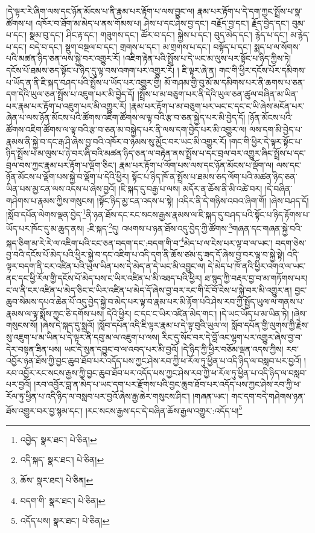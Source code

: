 །དེ་ལྟར་རེ་ཞིག་ལས་དང་ཉོན་མོངས་པ་ནི་རྣམ་པར་རྟོག་པ་ལས་བྱུང་ལ། རྣམ་པར་རྟོག་པ་དེ་དག་ཀྱང་སྤྲོས་པ་སྣ་ཚོགས་པ། འཁོར་བ་ཐོག་མ་མེད་པ་ནས་གོམས་པ། ཤེས་པ་དང་ཤེས་བྱ་དང་། བརྗོད་བྱ་དང་། རྗོད་བྱེད་དང་། བུམ་པ་དང་། སྣམ་བུ་དང་། ཤིང་རྟ་དང་། གཟུགས་དང་། ཚོར་བ་དང་། སྐྱེས་པ་དང་། བུད་མེད་དང་། རྙེད་པ་དང་། མ་རྙེད་པ་དང་། བདེ་བ་དང་། སྡུག་བསྔལ་བ་དང་། གྲགས་པ་དང་། མ་གྲགས་པ་དང་། བསྟོད་པ་དང་། སྨད་པ་ལ་སོགས་པའི་མཚན་ཉིད་ཅན་ལས་སྐྱེ་བར་འགྱུར་རོ། །འཇིག་རྟེན་པའི་སྤྲོས་པ་དེ་ཡང་མ་ལུས་པར་སྟོང་པ་ཉིད་ཀྱིས་ཏེ། དངོས་པོ་ཐམས་ཅད་སྟོང་པ་ཉིད་དུ་ལྟ་བས་འགག་པར་འགྱུར་རོ། །
ཇི་ལྟར་ཞེ་ན། གང་གི་ཕྱིར་དངོས་པོར་དམིགས་པ་ཡོད་ན་ནི་ཇི་སྐད་བཤད་པའི་སྤྲོས་པ་ཡོད་པར་འགྱུར་གྱི། མོ་གཤམ་གྱི་བུ་མོ་མ་དམིགས་པར་ནི་ཆགས་པ་ཅན་དག་དེའི་ཡུལ་ཅན་སྤྲོས་པ་འཇུག་པར་མི་བྱེད་དོ། །སྤྲོས་པ་མ་བཅུག་པར་ནི་དེའི་ཡུལ་ཅན་ཚུལ་བཞིན་མ་ཡིན་པར་རྣམ་པར་རྟོག་པ་འཇུག་པར་མི་འགྱུར་རོ། །རྣམ་པར་རྟོག་པ་མ་བཅུག་པར་ཡང་ང་དང་ང་ཡི་ཞེས་མངོན་པར་ཞེན་པ་ལས་ཉོན་མོངས་པའི་ཚོགས་འཇིག་ཚོགས་ལ་ལྟ་བའི་རྩ་བ་ཅན་སྐྱེད་པར་མི་བྱེད་དོ། །ཉོན་མོངས་པའི་ཚོགས་འཇིག་ཚོགས་ལ་ལྟ་བའི་རྩ་བ་ཅན་མ་བསྐྱེད་པར་ནི་ལས་དག་བྱེད་པར་མི་འགྱུར་ལ། ལས་དག་མི་བྱེད་པ་རྣམས་ནི་སྐྱེ་བ་དང་རྒ་ཤི་ཞེས་བྱ་བའི་འཁོར་བ་ཉམས་སུ་མྱོང་བར་ཡང་མི་འགྱུར་རོ། །གང་གི་ཕྱིར་དེ་ལྟར་སྟོང་པ་ཉིད་སྤྲོས་པ་མ་ལུས་པ་ཉེ་བར་ཞི་བའི་མཚན་ཉིད་ཅན་ལ་བརྟེན་ནས་སྤྲོས་པ་དང་བྲལ་བར་འགྱུར་ཞིང་སྤྲོས་པ་དང་བྲལ་བས་ཀྱང་རྣམ་པར་རྟོག་པ་ལྡོག་ཅིང་། རྣམ་པར་རྟོག་པ་ལོག་པས་ལས་དང་ཉོན་མོངས་པ་ལྡོག་ལ། ལས་དང་ཉོན་མོངས་པ་ལྡོག་པས་སྐྱེ་བ་ལྡོག་པ་དེའི་ཕྱིར། སྟོང་པ་ཉིད་ཁོ་ན་སྤྲོས་པ་ཐམས་ཅད་ལོག་པའི་མཚན་ཉིད་ཅན་ཡིན་པས་མྱ་ངན་ལས་འདས་པ་ཞེས་བྱའོ། །ཇི་སྐད་དུ་བརྒྱ་པ་ལས། མདོར་ན་ཆོས་ནི་མི་འཚེ་བར། །དེ་བཞིན་གཤེགས་པ་རྣམས་ཀྱིས་གསུངས། །སྟོང་ཉིད་མྱ་ངན་འདས་པ་སྟེ། །འདིར་ནི་དེ་གཉིས་འབའ་ཞིག་གོ། །ཞེས་བཤད་དོ། །སློབ་དཔོན་ལེགས་ལྡན་བྱེད་\footnote{འབྱེད་  སྣར་ཐང་།  པེ་ཅིན། }ནི་ཉན་ཐོས་དང་རང་སངས་རྒྱས་རྣམས་ལ་ཇི་སྐད་དུ་བཤད་པའི་སྟོང་པ་ཉིད་རྟོགས་པ་ཡོད་པར་ཁོང་དུ་མ་ཆུད་ནས། :ཇི་སྐད་\footnote{འདི་སྐད་  སྣར་ཐང་།  པེ་ཅིན། }དུ། འཕགས་པ་ཉན་ཐོས་འདུ་བྱེད་ཀྱི་ཚོགས་\footnote{ཆོས་  སྣར་ཐང་།  པེ་ཅིན། }གཞན་དང་གཞན་སྐྱེ་བའི་སྐད་ཅིག་མ་རེ་རེ་ལ་འཇིག་པའི་ངང་ཅན་བདག་དང་:བདག་གི་བ་\footnote{བདག་གི་  སྣར་ཐང་།  པེ་ཅིན། }མེད་པ་ལ་ངེས་པར་ལྟ་བ་ལ་ཡང་། བདག་ཅེས་བྱ་བའི་དངོས་པོ་མེད་པའི་ཕྱིར་སྐྱེ་བ་དང་འཇིག་པ་འདི་དག་ནི་ཆོས་ཙམ་དུ་ཟད་དོ་ཞེས་བྱ་བར་ལྟ་བ་སྐྱེ་སྟེ། འདི་ལྟར་བདག་ནི་ངར་འཛིན་པའི་ཡུལ་ཡིན་པས་དེ་མེད་ན་དེ་ཡང་མི་འབྱུང་ལ། དེ་མེད་པ་ཁོ་ནའི་ཕྱིར་འགའ་ལ་ཡང་ནང་དང་ཕྱི་རོལ་གྱི་དངོས་པོ་མེད་པས་ང་ཡིར་འཛིན་པ་མི་འཐད་པའི་ཕྱིར། ཐ་སྙད་ཀྱི་བརྡར་བྱ་བ་མ་གཏོགས་པར། ང་ལ་ནི་ངར་འཛིན་པ་མེད་ཅིང་ང་ཡིར་འཛིན་པ་མེད་དོ་ཞེས་བྱ་བར་རང་གི་ངོ་བོ་ངེས་པ་སྐྱེ་བར་མི་འགྱུར་ན། བྱང་ཆུབ་སེམས་དཔའ་ཆེན་པོ་འདུ་བྱེད་སྐྱེ་བ་མེད་པར་ལྟ་བ་རྣམ་པར་མི་རྟོག་པའི་ཤེས་རབ་ཀྱི་སྤྱོད་ཡུལ་ལ་གནས་པ་རྣམས་ལ་ལྟ་སྨོས་ཀྱང་ཅི་དགོས་པས། དེའི་ཕྱིར། ང་དང་ང་ཡིར་འཛིན་མེད་གང་། །དེ་ཡང་ཡོད་པ་མ་ཡིན་ཏེ། །ཞེས་གསུངས་སོ། །ཞེས་དེ་སྐད་དུ་སྨྲའོ། །སློབ་དཔོན་འདི་ཇི་ལྟར་རྣམ་པ་དེ་ལྟ་བུའི་ཡུལ་ལ། སློབ་དཔོན་གྱི་ལུགས་ཀྱི་རྗེས་སུ་འཇུག་པ་མ་ཡིན་པ་དེ་ལྟར་ནི་དབུ་མ་ལ་འཇུག་པ་ལས། རིང་དུ་སོང་བར་དེ་བློ་འང་ལྷག་པར་འགྱུར་ཞེས་བྱ་བ་དེར་བསྟན་ཟིན་པས། ཡང་དེ་སུན་དབྱུང་བ་ལ་འབད་པར་མི་བྱའོ། །དེ་ཉིད་ཀྱི་ཕྱིར་བཅོམ་ལྡན་འདས་ཀྱིས། རབ་འབྱོར་ཉན་ཐོས་ཀྱི་བྱང་ཆུབ་ཐོབ་པར་འདོད་པས་ཀྱང་ཤེས་རབ་ཀྱི་ཕ་རོལ་ཏུ་ཕྱིན་པ་འདི་ཉིད་ལ་བསླབ་པར་བྱའོ། །རབ་འབྱོར་རང་སངས་རྒྱས་ཀྱི་བྱང་ཆུབ་ཐོབ་པར་འདོད་པས་ཀྱང་ཤེས་རབ་ཀྱི་ཕ་རོལ་ཏུ་ཕྱིན་པ་འདི་ཉིད་ལ་བསླབ་པར་བྱའོ། །རབ་འབྱོར་བླ་ན་མེད་པ་ཡང་དག་པར་རྫོགས་པའི་བྱང་ཆུབ་ཐོབ་པར་འདོད་པས་ཀྱང་ཤེས་རབ་ཀྱི་ཕ་རོལ་ཏུ་ཕྱིན་པ་འདི་ཉིད་ལ་བསླབ་པར་བྱའོ་ཞེས་རྒྱ་ཆེར་གསུངས་ཤིང་། །གཞན་ཡང་། གང་དག་བདེ་གཤེགས་ཉན་ཐོས་འགྱུར་བར་བྱ་སྙམ་དང་། །རང་སངས་རྒྱས་དང་དེ་བཞིན་ཆོས་རྒྱལ་འགྱུར་:འདོད་པ།\footnote{འདོད་པས།  སྣར་ཐང་།  པེ་ཅིན། } 